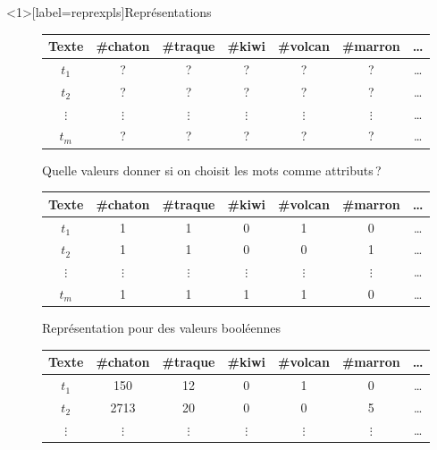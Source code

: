 \documentclass[../allslides.tex]{subfiles}
\begin{document}
\begin{frame}<1>[label=reprexpls]{Représentations}
	\begin{overprint}
			\begin{figure}
				\begin{tabular}{c*{5}{c}c}
					\toprule
					\textbf{Texte}	& {\textbf{\#chaton}}	& {\textbf{\#traque}}	& {\textbf{\#kiwi}}	& {\textbf{\#volcan}}	& {\textbf{\#marron}}	& {…}\\
					\midrule
					\(t_1\)	& ?	& ?	& ?	& ?	& ?	& …\\
					\(t_2\)	& ?	& ?	& ?	& ?	& ?	& …\\
					\(⋮\)	& \(⋮\)	& \(⋮\)	& \(⋮\)	& \(⋮\)	& \(⋮\)	& …\\
					\(t_m\)	& ?	& ?	& ?	& ?	& ?	& …\\
					\bottomrule
				\end{tabular}
				\caption{Quelle valeurs donner si on choisit les mots comme attributs ?}
			\end{figure}
			\begin{figure}
				\begin{tabular}{c*{5}{c}c}
					\toprule
					\textbf{Texte}	& {\textbf{\#chaton}}	& {\textbf{\#traque}}	& {\textbf{\#kiwi}}	& {\textbf{\#volcan}}	& {\textbf{\#marron}}	& {…}\\
					\midrule
					\(t_1\)	& 1	& 1	& 0	& 1	& 0	& …\\
					\(t_2\)	& 1	& 1	& 0	& 0	& 1	& …\\
					\(⋮\)	& \multicolumn{1}{c}{\(⋮\)}	& \multicolumn{1}{c}{\(⋮\)}	& \multicolumn{1}{c}{\(⋮\)}	& \multicolumn{1}{c}{\(⋮\)}	& \multicolumn{1}{c}{\(⋮\)}	& …\\
					\(t_m\)	& 1	& 1	& 1	& 1	& 0	& …\\
					\bottomrule
				\end{tabular}
				\caption{Représentation pour des valeurs booléennes}
			\end{figure}
			\begin{figure}
				\begin{tabular}{c*{5}{S[table-format=4.0]}c}
					\toprule
					\textbf{Texte}	& {\textbf{\#chaton}}	& {\textbf{\#traque}}	& {\textbf{\#kiwi}}	& {\textbf{\#volcan}}	& {\textbf{\#marron}}	& {…}\\
					\midrule
					\(t_1\)	& 150	& 12	& 0	& 1	& 0	& …\\
					\(t_2\)	& 2713	& 20	& 0	& 0	& 5	& …\\
					\(⋮\)	& \multicolumn{1}{c}{\(⋮\)}	& 	& 	& 	& 	& …\\

\end{tabular}
\end{figure}
\end{overprint}
\end{frame}
\end{document}
